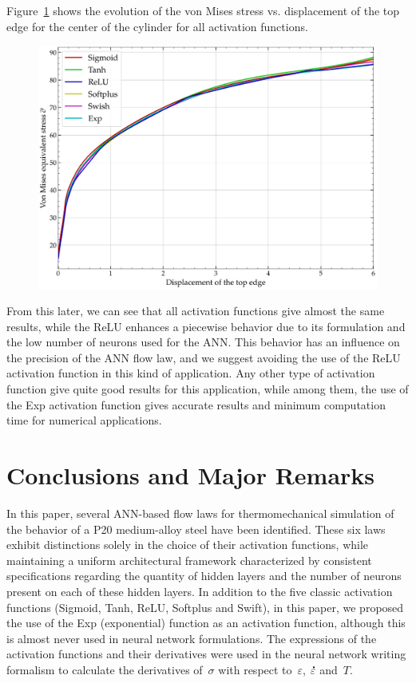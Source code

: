 \documentclass[algorithms,article,accept,pdftex,oneauthor]{Definitions/mdpi}
\DeclareRobustCommand{\mdot}[1]{\accentset{\mbox{\bfseries .}}{#1}}
\begin{document}
Figure~\ref{fig:Num-misesTH} shows the evolution of the von Mises stress vs. displacement of the top edge for the center of the cylinder for all activation functions.
\begin{figure}[H]
\includegraphics[width=0.7\columnwidth]{Figures/vonMises}
\caption{}
\label{fig:Num-misesTH}
\end{figure}
From this later, we can see that all activation functions give almost the same results, while the ReLU enhances a piecewise behavior due to its formulation and the low number of neurons used for the ANN.
This behavior has an influence on the precision of the ANN flow law, and we suggest avoiding the use of the ReLU activation function in this kind of application.
Any other type of activation function give quite good results for this application, while among them, the use of the Exp activation function gives accurate results and minimum computation time for numerical applications.

\section{Conclusions and Major Remarks}\label{sec:Conclusions}

In this paper, several ANN-based flow laws for thermomechanical simulation of the behavior of a P20 medium-alloy steel have been identified.
These six laws exhibit distinctions solely in the choice of their activation functions, while maintaining a uniform architectural framework characterized by consistent specifications regarding the quantity of hidden layers and the number of neurons present on each of these hidden layers.
In addition to the five classic activation functions (Sigmoid, Tanh, ReLU, Softplus and Swift), in this paper, we proposed the use of the Exp (exponential) function as an activation function, although this is almost never used in neural network formulations.
The expressions of the activation functions and their derivatives were used in the neural network writing formalism to calculate the derivatives of~$\sigma$ with respect to~$\varepsilon$, $\mdot{\varepsilon}$ and~$T$.
\end{document}
